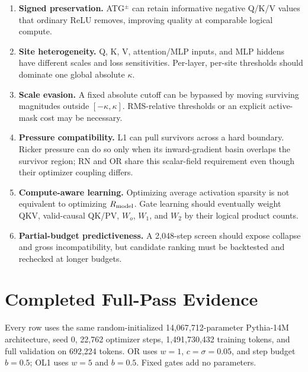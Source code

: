 \documentclass[10pt]{article}
\newcommand{\tightsection}[1]{\section{#1}\vspace{-0.35em}}
\newcommand{\Rmodel}{R_{\rm model}}
\begin{document}
\begin{enumerate}
\item \textbf{Signed preservation.} ATG$^{\pm}$ can retain informative negative Q/K/V values that ordinary ReLU removes, improving quality at comparable logical compute.
\item \textbf{Site heterogeneity.} Q, K, V, attention/MLP inputs, and MLP hiddens have different scales and loss sensitivities. Per-layer, per-site thresholds should dominate one global absolute $\kappa$.
\item \textbf{Scale evasion.} A fixed absolute cutoff can be bypassed by moving surviving magnitudes outside $[-\kappa,\kappa]$. RMS-relative thresholds or an explicit active-mask cost may be necessary.
\item \textbf{Pressure compatibility.} L1 can pull survivors across a hard boundary. Ricker pressure can do so only when its inward-gradient basin overlaps the survivor region; RN and OR share this scalar-field requirement even though their optimizer coupling differs.
\item \textbf{Compute-aware learning.} Optimizing average activation sparsity is not equivalent to optimizing $\Rmodel$. Gate learning should eventually weight QKV, valid-causal QK/PV, $W_o$, $W_1$, and $W_2$ by their logical product counts.
\item \textbf{Partial-budget predictiveness.} A 2,048-step screen should expose collapse and gross incompatibility, but candidate ranking must be backtested and rechecked at longer budgets.
\end{enumerate}

\tightsection{Completed Full-Pass Evidence}

Every row uses the same random-initialized 14,067,712-parameter Pythia-14M architecture, seed 0, 22,762 optimizer steps, 1,491,730,432 training tokens, and full validation on 692,224 tokens. OR uses $w=1$, $c=\sigma=0.05$, and step budget $b=0.5$; OL1 uses $w=5$ and $b=0.5$. Fixed gates add no parameters.
\end{document}
